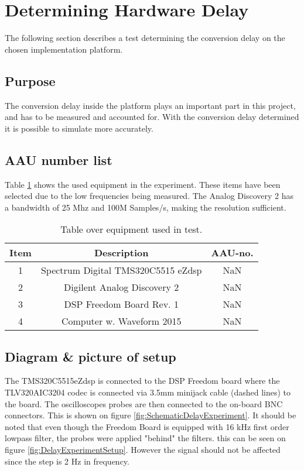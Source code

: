 \section{Determining Hardware Delay} \label{sec:HardwareDelay}

The following section describes a test determining the conversion delay on the chosen implementation platform.

\subsection{Purpose}

The conversion delay inside the platform plays an important part in this project, and has to be measured and accounted for. With the conversion delay determined it is possible to simulate more accurately.

\subsection{AAU number list}
Table \ref{tab:MeasDelayTable} shows the used equipment in the experiment. These items have been selected due to the low frequencies being measured. The Analog Discovery 2 has a bandwidth of 25 Mhz and 100M Samples/s, making the resolution sufficient.  
\begin{table}[H]
	\centering
	\begin{tabular}{ c c c } \toprule
		{Item}	& {Description} 						& {AAU-no}. \\ \bottomrule 
		1	&	Spectrum Digital TMS320C5515 eZdsp	& NaN	\\
		2	&	Digilent Analog Discovery 2	& NaN		\\
		3	&	DSP Freedom Board Rev. 1 & NaN		\\
		4	&	Computer w. Waveform 2015					& NaN		\\
		\bottomrule
	\end{tabular}
	\caption{Table over equipment used in test.}
	\label{tab:MeasDelayTable}
\end{table}

\subsection{Diagram \& picture of setup}

The TMS320C5515eZdsp is connected to the DSP Freedom board where the TLV320AIC3204 codec is connected via 3.5mm minijack cable (dashed lines) to the board. The oscilloscopes probes are then connected to the on-board BNC connectors. This is shown on figure \ref{fig:SchematicDelayExperiment}. It should be noted that even though the Freedom Board is equipped with 16 kHz first order lowpass filter, the probes were applied "behind" the filters. this can be seen on figure \ref{fig:DelayExperimentSetup}. However the signal should not be affected since the step is 2 Hz in frequency. 

